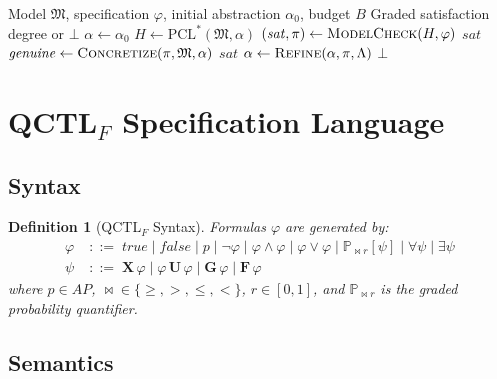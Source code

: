 \documentclass[11pt]{article}
\newtheorem{definition}[theorem]{Definition}
\newcommand{\coalcegar}{\textsc{CoalCEGAR}}
\newcommand{\qctlf}{QCTL$_F$}
\begin{document}
\begin{algorithm}[t]
\caption{\coalcegar{}: Abstraction--Refinement Loop}\label{alg:coalcegar}
\begin{algorithmic}[1]
\Require Model $\mathfrak{M}$, specification $\varphi$, initial
  abstraction $\alpha_0$, budget $B$
\Ensure Graded satisfaction degree or $\bot$
\State $\alpha \gets \alpha_0$
\Repeat
  \State $H \gets \text{PCL}^*(\mathfrak{M}, \alpha)$
  \State $(\mathit{sat}, \pi) \gets \textsc{ModelCheck}(H, \varphi)$
    \State \Return $\mathit{sat}$
  \EndIf
  \State $\mathit{genuine} \gets \textsc{Concretize}(\pi, \mathfrak{M}, \alpha)$
    \State \Return $\mathit{sat}$
  \EndIf
  \State $\alpha \gets \textsc{Refine}(\alpha, \pi, \Lambda)$
\State \Return $\bot$
\end{algorithmic}
\end{algorithm}

\section{\qctlf{} Specification Language}\label{app:qctlf}

\subsection{Syntax}

\begin{definition}[\qctlf{} Syntax]\label{def:qctlf}
Formulas $\varphi$ are generated by:
\begin{align*}
\varphi &\;::=\; \mathit{true} \mid \mathit{false}
  \mid p \mid \lnot \varphi \mid \varphi \land \varphi
  \mid \varphi \lor \varphi
  \mid \mathbb{P}_{\bowtie r}[\psi]
  \mid \forall\psi \mid \exists\psi \\
\psi &\;::=\; \mathbf{X}\,\varphi \mid \varphi\,\mathbf{U}\,\varphi
  \mid \mathbf{G}\,\varphi \mid \mathbf{F}\,\varphi
\end{align*}
where $p \in \mathit{AP}$, ${\bowtie} \in \{\ge, >, \le, <\}$,
$r \in [0,1]$, and $\mathbb{P}_{\bowtie r}$ is the graded
probability quantifier.
\end{definition}

\subsection{Semantics}
\end{document}
